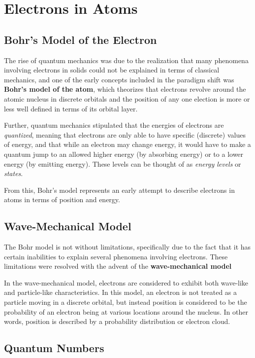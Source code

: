 \documentclass{article}
\begin{document}
\section{Electrons in Atoms}

\subsection{Bohr's Model of the Electron}

The rise of quantum mechanics was due to the realization that many phenomena involving electrons in solids could not be explained in terms of classical mechanics, and one of the early concepts included in the paradigm shift was \textbf{Bohr's model of the atom}, which theorizes that electrons revolve around the atomic nucleus in discrete orbitals and the position of any one election is more or less well defined in terms of its orbital layer.

Further, quantum mechanics stipulated that the energies of electrons are \textit{quantized}, meaning that electrons are only able to have specific (discrete) values of energy, and that while an electron may change energy, it would have to make a quantum jump to an allowed higher energy (by absorbing energy) or to a lower energy (by emitting energy). These levels can be thought of as \textit{energy levels} or \textit{states}.

From this, Bohr's model represents an early attempt to describe electrons in atoms in terms of position and energy.

\subsection{Wave-Mechanical Model}

The Bohr model is not without limitations, specifically due to the fact that it has certain inabilities to explain several phenomena involving electrons. These limitations were resolved with the advent of the \textbf{wave-mechanical model}

In the wave-mechanical model, electrons are considered to exhibit both wave-like and particle-like characteristics. In this model, an electron is not treated as a particle moving in a discrete orbital, but instead position is considered to be the probability of an electron being at various locations around the nucleus. In other words, position is described by a probability distribution or electron cloud.

\subsection{Quantum Numbers}
\end{document}
